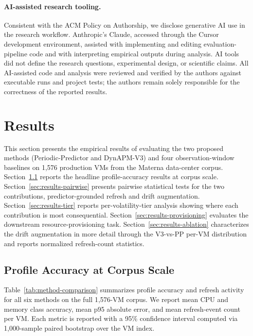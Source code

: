 \documentclass[manuscript,screen,review,anonymous]{acmart}
\begin{document}
\paragraph{AI-assisted research tooling.}
Consistent with the ACM Policy on Authorship, we disclose generative
AI use in the research workflow. Anthropic's Claude, accessed through
the Cursor development environment, assisted with implementing and
editing evaluation-pipeline code and with interpreting empirical
outputs during analysis. AI tools did not define the research
questions, experimental design, or scientific claims. All
AI-assisted code and analysis were reviewed and verified by the
authors against executable runs and project tests; the authors remain
solely responsible for the correctness of the reported results.

\section{Results}\label{sec:results}

This section presents the empirical results of evaluating the two
proposed methods (Periodic-Predictor and DynAPM-V3) and four
observation-window baselines on 1{,}576 production VMs from the
Materna data-center corpus. Section~\ref{sec:results-accuracy} reports the
headline profile-accuracy results at corpus scale.
Section~\ref{sec:results-pairwise} presents pairwise statistical
tests for the two contributions, predictor-grounded refresh and
drift augmentation. Section~\ref{sec:results-tier} reports
per-volatility-tier analysis showing where each contribution is
most consequential. Section~\ref{sec:results-provisioning}
evaluates the downstream resource-provisioning task.
Section~\ref{sec:results-ablation} characterizes the drift
augmentation in more detail through the V3-vs-PP per-VM
distribution and reports normalized refresh-count statistics.

\subsection{Profile Accuracy at Corpus Scale}\label{sec:results-accuracy}

Table~\ref{tab:method-comparison} summarizes profile accuracy and
refresh activity for all six methods on the full 1{,}576-VM
corpus. We report mean CPU and memory class accuracy, mean p95
absolute error, and mean refresh-event count per VM. Each
metric is reported with a 95\% confidence interval computed via
1{,}000-sample paired bootstrap over the VM index.
\end{document}
